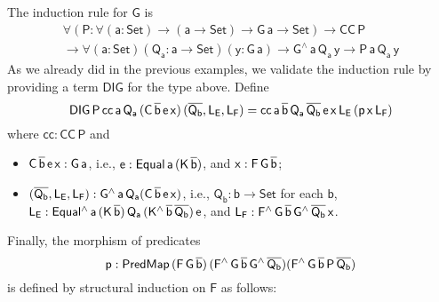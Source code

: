 \documentclass[9pt]{entcs} \usepackage{entcsmacro}
\begin{document}
The induction rule for $\mathsf{G}$ is
\begin{multline*}
\mathsf{\forall (P : \forall (a : Set) \to (a \to Set) \to G\,a \to Set) \to CC\,P} \\
\mathsf{\to \forall (a : Set)(Q_a : a \to Set)(y : G\,a) \to G^{\wedge}\,a\,Q_a\,y \to P\,a\,Q_a\,y}
\end{multline*}
As we already did in the previous examples,
we validate the induction rule by providing a term $\mathsf{DIG}$ for the type above.
Define
\[
\mathsf{DIG\,P\,cc\,a\,Q_a\,(C\,\overline{b}\,e\,x)\,(\overline{Q_b}, L_E, L_F)
= cc\,a\,\overline{b}\,Q_a\,\overline{Q_b}\,e\,x\,L_E\,(p\,x\,L_F)}
\]
where $\mathsf{cc : CC\,P}$ and
\begin{itemize}
\item $\mathsf{C\,\overline{b}\,e\,x : G\,a}$,
i.e., $\mathsf{e : Equal\,a\,(K\,\overline{b})}$,
and $\mathsf{x : F\,G\,\overline{b}}$;
\item $\mathsf{(\overline{Q_b}, L_E, L_F) : G^{\wedge}\,a\,Q_a (C\,\overline{b}\,e\,x)}$,
i.e.,
$\mathsf{Q_b : b \to Set}$ for each $\mathsf{b}$,
$\mathsf{L_E : Equal^{\wedge}\,a\,(K\,\overline{b})\,Q_a\,(K^{\wedge}\,\overline{b}\,\overline{Q_b})\,e}$,
and $\mathsf{L_F : F^{\wedge}\,G\,\overline{b}\,G^{\wedge}\,{\overline{Q_b}}\,x}$.
\end{itemize}
Finally, the morphism of predicates
\[
\mathsf{p : PredMap\,(F\,G\,\overline{b})\,(F^{\wedge}\,G\,\overline{b}\,G^{\wedge}\,\overline{Q_b}) (F^{\wedge}\,G\,\overline{b}\,P\,\overline{Q_b})}
\]
is defined by structural induction on $\mathsf{F}$ as follows:
\end{document}
